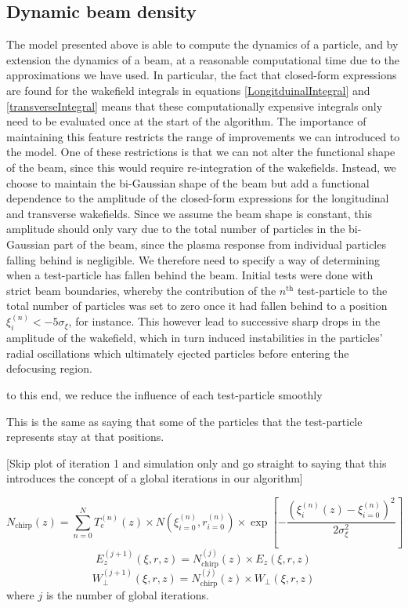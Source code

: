 \subsection{Dynamic beam density}
The model presented above is able to compute the dynamics of a particle, and by extension the dynamics of a beam, at a reasonable computational time due to the approximations we have used. In particular, the fact that closed-form expressions are found for the wakefield integrals in equations \ref{LongitduinalIntegral} and \ref{transverseIntegral} means that these computationally expensive integrals only need to be evaluated once at the start of the algorithm. The importance of maintaining this feature restricts the range of improvements we can introduced to the model. One of these restrictions is that we can not alter the functional shape of the beam, since this would require re-integration of the wakefields. Instead, we choose to maintain the bi-Gaussian shape of the beam but add a functional dependence to the amplitude of the closed-form expressions for the longitudinal and transverse wakefields. Since we assume the beam shape is constant, this amplitude should only vary due to the total number of particles in the bi-Gaussian part of the beam, since the plasma response from individual particles falling behind is negligible. We therefore need to specify a way of determining when a test-particle has fallen behind the beam. Initial tests were done with strict beam boundaries, whereby the contribution of the $n^\text{th}$ test-particle to the total number of particles was set to zero once it had fallen behind to a position $\xi_{i}^{(n)}<-5\sigma_{\xi}$, for instance. This however lead to successive sharp drops in the amplitude of the wakefield, which in turn induced instabilities in the particles' radial oscillations which ultimately ejected particles before entering the defocusing region. 

to this end, we reduce the influence of each test-particle smoothly 

This is the same as saying that some of the particles that the test-particle represents stay at that positions.

[Skip plot of iteration 1 and simulation only and go straight to saying that this introduces the concept of a global iterations in our algorithm]

\begin{equation}
N_{\text{chirp}}(z)= \sum_{n=0}^N T_e^{(n)}(z)\times N\left(\xi_{i=0}^{(n)},r_{i=0}^{(n)}\right)\times \exp[-\frac{\left(\xi_i^{(n)}(z)-\xi_{i=0}^{(n)}\right)^2}{2\sigma_{\xi}^2}]
\end{equation}
\begin{equation}
E_z^{(j+1)}\left(\xi,r,z\right)=N^{(j)}_{\text{chirp}}(z)\times E_z\left(\xi,r,z\right) 
\end{equation}
\begin{equation}
W_{\perp}^{(j+1)}\left(\xi,r,z\right)=N^{(j)}_{\text{chirp}}(z)\times W_{\perp}\left(\xi,r,z\right)
\end{equation}
where $j$ is the number of global iterations.


